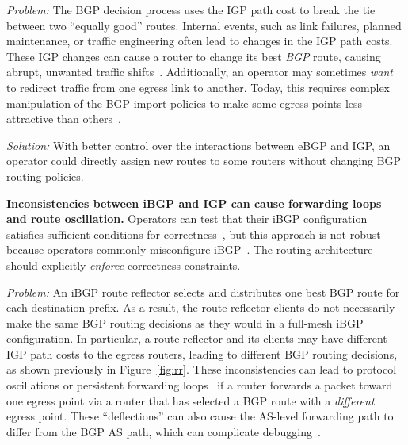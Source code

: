 \vspace{0.05in}
\noindent
{\em Problem:} 
The BGP decision process uses the IGP path cost to break
the tie between two ``equally good'' routes. Internal events, such as
link failures, planned maintenance, or traffic engineering often lead to
changes in the IGP path costs.  These IGP changes can cause a router to
change its best {\em BGP\/} route, causing abrupt, unwanted traffic
shifts~\cite{teixeira2004b}.  Additionally, an operator may sometimes {\em
want\/} to redirect traffic from one egress link to another.  Today,
this requires complex manipulation of the BGP import policies to make
some egress points less attractive than others~\cite{Feamster2003e}.

\vspace{0.05in}
\noindent
{\em Solution:} 
With better control over the interactions between eBGP and IGP, an
operator could directly assign new routes to some routers without changing
BGP routing policies.
\vspace{0.05in}

{\bf Inconsistencies between iBGP and IGP can cause
forwarding loops and route oscillation.}  Operators can test that
their iBGP configuration satisfies sufficient conditions for
correctness~\cite{Griffin2002}, but this 
approach is not robust because operators commonly misconfigure
iBGP~\cite{Feamster2004h}.  The routing architecture should
explicitly {\em enforce\/} correctness constraints.  

\vspace{0.05in}
\noindent
{\em Problem:}
An
iBGP route reflector selects and distributes one best BGP route for each
destination prefix.  As a result, the route-reflector clients do not
necessarily make the same BGP routing decisions as they would in a
full-mesh iBGP configuration.  In particular, a route reflector and
its clients may have different IGP path costs to the
egress routers, leading to different BGP routing decisions, as shown 
previously in Figure~\ref{fig:rr}. 
These inconsistencies can lead to protocol oscillations or persistent
forwarding loops~\cite{Basu2002,Griffin2002,rfc3345} if a router
forwards a packet toward one egress point via a router that has
selected a BGP route with a {\em different} egress point.  These
``deflections'' can also cause the AS-level forwarding path to differ
from the BGP AS path, which can complicate debugging~\cite{Mao2003}.

